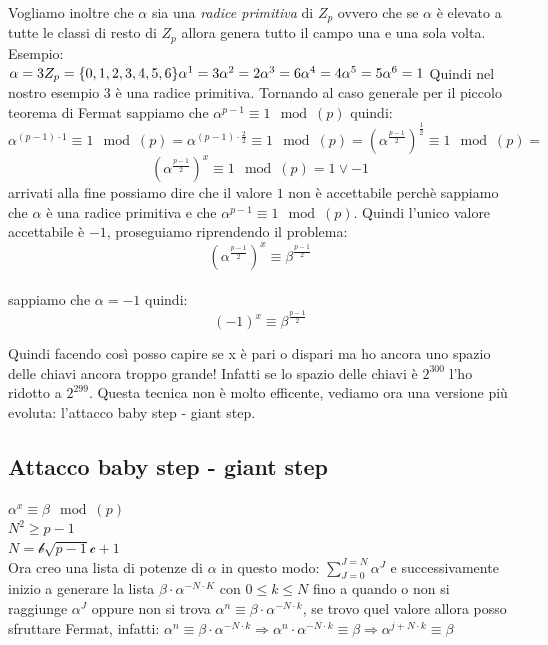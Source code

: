 \documentclass[10pt,a4paper]{article}
\begin{document}
Vogliamo inoltre che $\alpha$ sia una \textit{radice primitiva} di $Z_p$ ovvero che se $\alpha$ è elevato a tutte le classi di resto di $Z_p$ allora genera tutto il campo una e una sola volta.\\
Esempio:\\
$
\alpha = 3
\\Z_p=\{0,1,2,3,4,5,6\}\\
\alpha^1 = 3\\
\alpha^2 = 2\\
\alpha^3 = 6\\
\alpha^4 = 4\\
\alpha^5 = 5\\
\alpha^6 = 1\\
$
Quindi nel nostro esempio 3 è una radice primitiva. Tornando al caso generale per il piccolo teorema di Fermat sappiamo che $\alpha^{p-1}\equiv 1 \mod(p)$ quindi:
$$ \alpha^{(p-1)\cdot 1}\equiv 1 \mod(p) =\alpha^{(p-1)\cdot \frac{2}{2}}\equiv 1 \mod(p) = (\alpha^{\frac{p-1}{2}})^\frac{1}{2}\equiv 1 \mod(p) =$$ $$ (\alpha^{\frac{p-1}{2}})^x\equiv 1 \mod(p) = 1 \vee -1 $$
arrivati alla fine possiamo dire che il valore $1$ non è accettabile perchè sappiamo che $\alpha$ è una radice primitiva e che $\alpha^{p-1}\equiv 1 \mod(p)$. Quindi l'unico valore accettabile è $-1$, proseguiamo riprendendo il problema:\\
$$ (\alpha^{\frac{p-1}{2}})^x\equiv \beta^{\frac{p-1}{2}} $$\\

sappiamo che $\alpha = -1$ quindi:\\

$$(-1)^x \equiv \beta^{\frac{p-1}{2}}$$

Quindi facendo così posso capire se x è pari o dispari ma ho ancora uno spazio delle chiavi ancora troppo grande! Infatti se lo spazio delle chiavi è $2^{300}$ l'ho ridotto a $2^{299}$. Questa tecnica non è molto efficente, vediamo ora una versione più evoluta: l'attacco baby step - giant step.

\subsection{Attacco baby step - giant step}

$\alpha^x \equiv \beta \mod(p)$\\ $N^2\ge p-1 $\\ $N=\mathcal{b} \sqrt{p-1} \mathcal{c} +1$\\

Ora creo una lista di potenze di $\alpha$ in questo modo: $\sum_{J=0}^{J=N} \alpha^J$ e successivamente inizio a generare la lista $\beta \cdot \alpha^{-N\cdot K}$ con $0 \leq k \leq N$ fino a quando o non si raggiunge $\alpha^J$ oppure non si trova $\alpha^n \equiv \beta \cdot\alpha^{-N\cdot k}$, se trovo quel valore allora posso sfruttare Fermat, infatti:
$\alpha^n \equiv \beta \cdot\alpha^{-N\cdot k} \Rightarrow \alpha^n \cdot \alpha^{-N\cdot k} \equiv \beta \Rightarrow \alpha^{j+N\cdot k} \equiv \beta $\\
\end{document}

